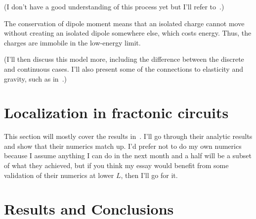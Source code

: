 \documentclass[a4paper,12pt]{article}
\begin{document}
(I don't have a good understanding of this process yet but I'll refer to~\cite{PretkoSubdim, RasmussenYouXu, SlagleTensor}.)

The conservation of dipole moment means that an isolated charge cannot move without creating an isolated dipole somewhere else, which costs energy. Thus, the charges are immobile in the low-energy limit. 

(I'll then discuss this model more, including the difference between the discrete and continuous cases. I'll also present some of the connections to elasticity and gravity, such as in~\cite{PretkoElasticity}.)


\section{Localization in fractonic circuits} \label{sec:fraccirc}

This section will mostly cover the results in~\cite{PaiFracton}. I'll go through their analytic results and show that their numerics match up. I'd prefer not to do my own numerics because I assume anything I can do in the next month and a half will be a subset of what they achieved, but if you think my essay would benefit from some validation of their numerics at lower $L$, then I'll go for it. 


\section{Results and Conclusions} \label{sec:conc}


\printbibliography
\end{document}

